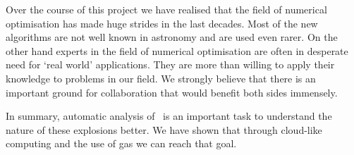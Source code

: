 Over the course of this project we have realised that the field of numerical optimisation has made huge strides in the last decades. Most of the new algorithms are not well known in astronomy and are used even rarer. On the other hand experts in the field of numerical optimisation are often in desperate need for `real world' applications. They are more than willing to apply their knowledge to problems in our field. We strongly believe that there is an important ground for collaboration that would benefit both sides immensely.


In summary, automatic analysis of \sneia\ is an important task to understand the nature of these explosions better. We have shown that through cloud-like computing and the use of \glspl{ga} we can reach that goal.

